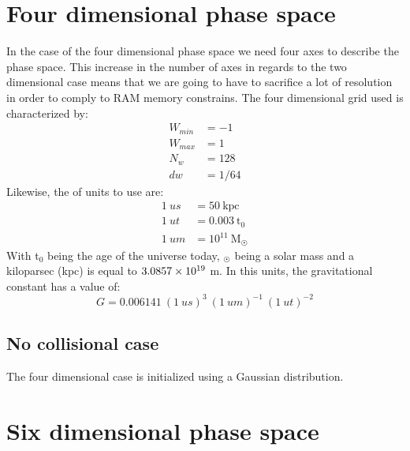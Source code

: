 \section{Four dimensional phase space}
In the case of the four dimensional phase space we need four axes to describe the phase space. This increase in the number of axes in regards to the two dimensional case means that we are going to have to sacrifice a lot of resolution in order to comply to RAM memory constrains. The four dimensional grid used is characterized by:
\begin{align}
W_{min} &= -1\\
W_{max} &= 1\\
N_w &= 128\\
dw &= 1/64
\end{align}
Likewise, the of units to use are:
\begin{align}
1\ us &= 50\ \text{kpc}\\
1\ ut &= 0.003 \ \text{t}_0\\
1\ um &= 10^{11} \ \text{M}_{\astrosun}
\end{align}
With t$_0$ being the age of the universe today, $_{\astrosun}$ being a solar mass and a kiloparsec (kpc) is equal to $3.0857\times 10^{19}$ m. In this units, the gravitational constant has a value of:
\begin{equation}
G = 0.006141 \ (1 \ us)^3 \ (1 \ um)^{-1} \ (1 \ ut)^{-2}
\end{equation}
\subsection{No collisional case}
The four dimensional case is initialized using a Gaussian distribution.














\newpage
\section{Six dimensional phase space}










